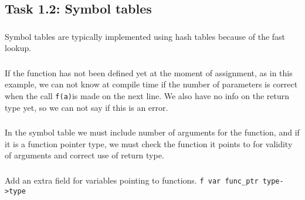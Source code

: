 \subsection{Task 1.2: Symbol tables}

\subsubsection{}
Symbol tables are typically implemented using hash tables because of the fast lookup.

\subsubsection{}
If the function has not been defined yet at the moment of assignment, as in this example, we can not know at compile time if the number of parameters is correct when the call \texttt{f(a)}is made on the next line. We also have no info on the return type yet, so we can not say if this is an error.

\subsubsection{}
In the symbol table we must include number of arguments for the function, and if it is a function pointer type, we must check the function it points to for validity of arguments and correct use of return type.

\subsubsection{}
Add an extra field for variables pointing to functions.
\texttt{f var func\_ptr type->type}
